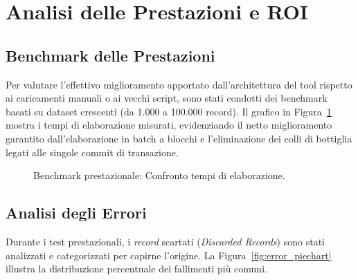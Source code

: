 \section{Analisi delle Prestazioni e ROI}\label{sec:analisi-delle-prestazioni-e-roi}

\subsection{Benchmark delle Prestazioni}\label{subsec:benchmark-delle-prestazioni}
Per valutare l'effettivo miglioramento apportato dall'architettura del tool rispetto ai caricamenti manuali o ai vecchi script,
sono stati condotti dei benchmark basati su dataset crescenti (da 1.000 a 100.000 record). Il grafico in Figura~\ref{fig:performance_benchmark} mostra i tempi
di elaborazione misurati, evidenziando il netto miglioramento garantito dall'elaborazione in batch a blocchi e l'eliminazione dei colli di
bottiglia legati alle singole commit di transazione.

\begin{figure}[H]
    \centering
    \caption{Benchmark prestazionale: Confronto tempi di elaborazione.}
    \label{fig:performance_benchmark}
\end{figure}

\subsection{Analisi degli Errori}\label{subsec:analisi-degli-errori}
Durante i test prestazionali, i \textit{record} scartati (\textit{Discarded Records}) sono stati analizzati e categorizzati per capirne l'origine.
La Figura~\ref{fig:error_piechart} illustra la distribuzione percentuale dei fallimenti più comuni.

